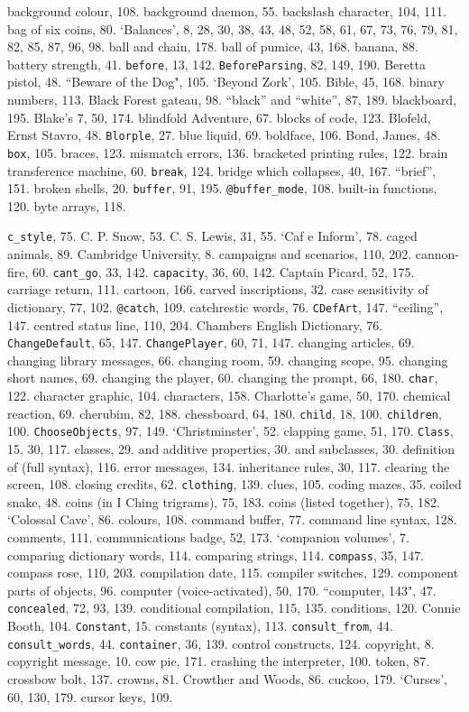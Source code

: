 {{{background colour, 108.
background daemon, 55.
backslash character, 104, 111.
bag of six coins, 80.
`Balances', 8, 28, 30, 38, 43, 48, 52, 58, 61, 67, 73, 76, 79, 81, 82, 85, 87, 96, 98.
ball and chain, 178.
ball of pumice, 43, 168.
banana, 88.
battery strength, 41.
{{\tt before}}, 13, 142.
{{\tt BeforeParsing}}, 82, 149, 190.
Beretta pistol, 48.
``Beware of the Dog", 105.
`Beyond Zork', 105.
Bible, 45, 168.
binary numbers, 113.
Black Forest gateau, 98.
``black'' and ``white'', 87, 189.
blackboard, 195.
Blake's 7, 50, 174.
blindfold Adventure, 67.
blocks of code, 123.
Blofeld, Ernst Stavro, 48.
{{\tt Blorple}}, 27.
blue liquid, 69.
boldface, 106.
Bond, James, 48.
{{\tt box}}, 105.
braces, 123.
\quad  mismatch errors, 136.
bracketed printing rules, 122.
brain transference machine, 60.
{{\tt break}}, 124.
bridge which collapses, 40, 167.
``brief'', 151.
broken shells, 20.
{{\tt buffer}}, 91, 195.
{{\tt @buffer\_mode}}, 108.
built-in functions, 120.
byte arrays, 118.

{{\tt c\_style}}, 75.
C. P. Snow, 53.
C. S. Lewis, 31, 55.
`Caf{ e} Inform', 78.
caged animals, 89.
Cambridge University, 8.
campaigns and scenarios, 110, 202.
cannon-fire, 60.
{{\tt cant\_go}}, 33, 142.
{{\tt capacity}}, 36, 60, 142.
Captain Picard, 52, 175.
carriage return, 111.
cartoon, 166.
carved inscriptions, 32.
case sensitivity of dictionary, 77, 102.
{{\tt @catch}}, 109.
catchrestic words, 76.
{{\tt CDefArt}}, 147.
``ceiling'', 147.
centred status line, 110, 204.
Chambers English Dictionary, 76.
{{\tt ChangeDefault}}, 65, 147.
{{\tt ChangePlayer}}, 60, 71, 147.
changing articles, 69.
changing library messages, 66.
changing room, 59.
changing scope, 95.
changing short names, 69.
changing the player, 60.
changing the prompt, 66, 180.
{{\tt char}}, 122.
character graphic, 104.
characters, 158.
Charlotte's game, 50, 170.
chemical reaction, 69.
cherubim, 82, 188.
chessboard, 64, 180.
{{\tt child}}, 18, 100.
{{\tt children}}, 100.
{{\tt ChooseObjects}}, 97, 149.
`Christminster', 52.
clapping game, 51, 170.
{{\tt Class}}, 15, 30, 117.
classes, 29.
\quad  and additive properties, 30.
\quad  and subclasses, 30.
\quad  definition of (full syntax), 116.
\quad  error messages, 134.
\quad  inheritance rules, 30, 117.
clearing the screen, 108.
closing credits, 62.
{{\tt clothing}}, 139.
clues, 105.
coding mazes, 35.
coiled snake, 48.
coins (in I Ching trigrams), 75, 183.
coins (listed together), 75, 182.
`Colossal Cave', 86.
colours, 108.
command buffer, 77.
command line syntax, 128.
comments, 111.
communications badge, 52, 173.
`companion volumes', 7.
comparing dictionary words, 114.
comparing strings, 114.
{{\tt compass}}, 35, 147.
compass rose, 110, 203.
compilation date, 115.
compiler switches, 129.
component parts of objects, 96.
computer (voice-activated), 50, 170.
``computer, 143", 47.
{{\tt concealed}}, 72, 93, 139.
conditional compilation, 115, 135.
conditions, 120.
Connie Booth, 104.
{{\tt Constant}}, 15.
constants (syntax), 113.
{{\tt consult\_from}}, 44.
{{\tt consult\_words}}, 44.
{{\tt container}}, 36, 139.
control constructs, 124.
copyright, 8.
copyright message, 10.
cow pie, 171.
crashing the interpreter, 100.
 token, 87.
crossbow bolt, 137.
crowns, 81.
Crowther and Woods, 86.
cuckoo, 179.
`Curses', 60, 130, 179.
cursor keys, 109.

}}}
